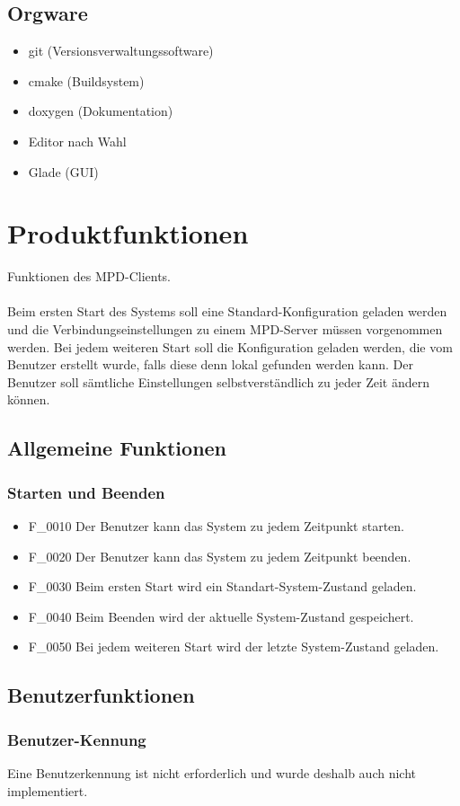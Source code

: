 \subsection{Orgware}
\begin{itemize}
	\item git (Versionsverwaltungssoftware)
	\item cmake (Buildsystem)
	\item doxygen (Dokumentation)
	\item Editor nach Wahl
	\item Glade (GUI)
\end{itemize}
\section{Produktfunktionen}
Funktionen des MPD-Clients.\ \\ \\
Beim ersten Start des Systems soll eine Standard-Konfiguration geladen werden und die Verbindungseinstellungen
zu einem MPD-Server müssen vorgenommen werden. Bei jedem weiteren Start soll die Konfiguration geladen werden,
die vom Benutzer erstellt wurde, falls diese denn lokal gefunden werden kann. Der Benutzer soll sämtliche
Einstellungen selbstverständlich zu jeder Zeit ändern können.
\subsection{Allgemeine Funktionen}
\subsubsection{Starten und Beenden}
\begin{itemize}
	\item F\_0010 Der Benutzer kann das System zu jedem Zeitpunkt starten.
	\item F\_0020 Der Benutzer kann das System zu jedem Zeitpunkt beenden.
	\item F\_0030 Beim ersten Start wird ein Standart-System-Zustand geladen.
	\item F\_0040 Beim Beenden wird der aktuelle System-Zustand gespeichert.
	\item F\_0050 Bei jedem weiteren Start wird der letzte System-Zustand geladen.
\end{itemize}
\subsection{Benutzerfunktionen}
\subsubsection{Benutzer-Kennung}
Eine Benutzerkennung ist nicht erforderlich und wurde deshalb auch nicht implementiert.
